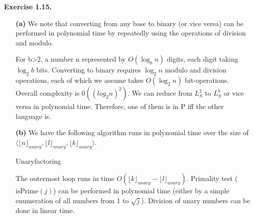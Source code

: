 \documentclass[a4paper]{article}
\newenvironment{exercise}[1]{
	\par
	\noindent\textbf{Exercise #1.}\quad
}{
	\par
	\bigskip
}
\begin{document}
\begin{exercise}{1.15}
    \begin{enumerate}
        \item[\textbf{(a)}]
        We note that converting from any base to binary (or vice versa) can be performed in polynomial time by repeatedly  using the operations of division and modulo.
        
        For b>2, a number n represented by $O(\log_b n)$ digits, each digit taking $\log_2 b$ bits. Converting to binary requires $\log_2 n$ modulo and division operations, each of which we assume takes $O(\log_2 n)$ bit-operations. Overall complexity is $0((log_2 n)^2)$.
        We can reduce from $L_S^2$ to $L_S^b$ or vice versa in polynomial time. Therefore, one of them is in P iff the other language is.
        \item[\textbf{(b)}]
        We have the following algorithm runs in polynomial time over the size of $\langle \lfloor n\rfloor_{unary},\lfloor l\rfloor_{unary},\lfloor k\rfloor_{unary} \rangle$.

            \begin{algorithm}[H]    
       \caption{Unaryfactoring}
       \end{algorithm}
       The outermost loop runs in time $O(\lfloor k\rfloor_{unary}-\lfloor l\rfloor_{unary})$. Primality test ($\mathrm{isPrime}(j)$) can be performed in polynomial time (either by a simple enumeration of all numbers from 1 to $\sqrt{j}$). Division of unary numbers can be done in linear time.
    \end{enumerate}
\end{exercise}
\end{document}
